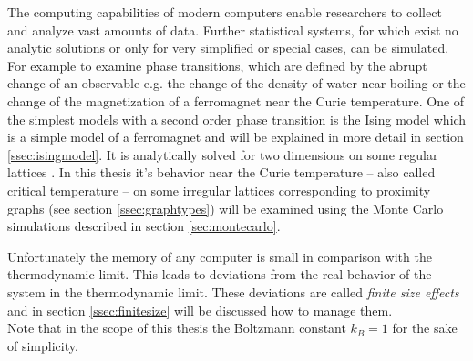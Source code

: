 The computing capabilities of modern computers enable researchers to
collect and analyze vast amounts of data.
Further statistical systems, for which exist no analytic solutions
or only for very simplified or special cases, can be simulated.
For example to examine phase transitions, which are defined by the abrupt
change of an observable e.g. the change of the density of water near
boiling or the change of the magnetization of a ferromagnet near the
Curie temperature. One of the simplest models with a second order
phase transition is the Ising model \cite{Ising1925} which is a simple
model of a ferromagnet and will be explained in more detail in section
\ref{ssec:isingmodel}. It is analytically solved for two dimensions on
some regular lattices \cite{Onsager1944} \cite{Wannier1945}.
In this thesis it's behavior near the Curie temperature -- also called
critical temperature -- on some irregular lattices corresponding to
proximity graphs (see section \ref{ssec:graphtypes}) will be examined
using the Monte Carlo simulations described in section \ref{sec:montecarlo}.

Unfortunately the memory of any computer is small in comparison with the
thermodynamic limit. This leads to deviations from the real behavior of
the system in the thermodynamic limit. These deviations are called
\emph{finite size effects} and in section \ref{ssec:finitesize} will be
discussed how to manage them.\\

Note that in the scope of this thesis the Boltzmann constant \(k_{B}=1\)
for the sake of simplicity.
